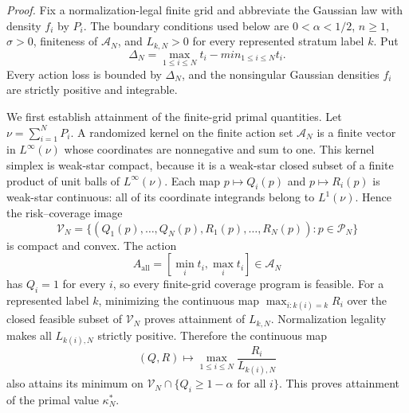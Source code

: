 \textit{Proof.}
Fix a normalization-legal finite grid and abbreviate the Gaussian law with
density \(f_i\) by \(P_i\).  The boundary conditions used below are
\(0<\alpha<1/2\), \(n\geq1\), \(\sigma>0\), finiteness of
\(\mathcal A_N\), and \(L_{k,N}>0\) for every represented stratum label
\(k\).  Put
\[
 \Delta_N=\max_{1\leq i\leq N}t_i-min_{1\leq i\leq N}t_i.
\]
Every action loss is bounded by \(\Delta_N\), and the nonsingular Gaussian
densities \(f_i\) are strictly positive and integrable.

We first establish attainment of the finite-grid primal quantities.  Let
\(\nu=\sum_{i=1}^NP_i\).  A randomized kernel on the finite action set
\(\mathcal A_N\) is a finite vector in \(L^\infty(\nu)\) whose coordinates
are nonnegative and sum to one.  This kernel simplex is weak-star compact,
because it is a weak-star closed subset of a finite product of unit balls of
\(L^\infty(\nu)\).  Each map \(p\mapsto Q_i(p)\) and
\(p\mapsto R_i(p)\) is weak-star continuous: all of its coordinate
integrands belong to \(L^1(\nu)\).  Hence the risk--coverage image
\[
 \mathcal V_N=\{(Q_1(p),\ldots,Q_N(p),R_1(p),\ldots,R_N(p)):
                  p\in\mathcal P_N\}
\]
is compact and convex.  The action
\[
 A_{\mathrm{all}}=[\min_i t_i,\max_i t_i]\in\mathcal A_N
\]
has \(Q_i=1\) for every \(i\), so every finite-grid coverage program is
feasible.  For a represented label \(k\), minimizing the continuous map
\(\max_{i:k(i)=k}R_i\) over the closed feasible subset of
\(\mathcal V_N\) proves attainment of \(L_{k,N}\).  Normalization legality
makes all \(L_{k(i),N}\) strictly positive.  Therefore the continuous map
\[
 (Q,R)\longmapsto\max_{1\leq i\leq N}
                 \frac{R_i}{L_{k(i),N}}
\]
also attains its minimum on
\(\mathcal V_N\cap\{Q_i\geq1-\alpha\text{ for all }i\}\).  This proves
attainment of the primal value \(\kappa_N^*\).


